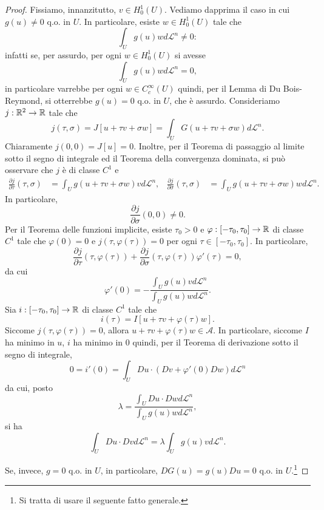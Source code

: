 \begin{proof}
Fissiamo, innanzitutto, $v \in H^1_0(U)$. Vediamo dapprima il caso in cui $g(u)\ne 0$ q.o. in $U$. In particolare, esiste $w \in H^1_0(U)$ tale che 
\[ \int_U g(u)wd\mathcal{L}^n \ne 0: \]
infatti se, per assurdo, per ogni $w \in H^1_0(U)$ si avesse 
\[ \int_U g(u)wd\mathcal{L}^n = 0, \]
in particolare varrebbe per ogni $w \in C^\infty_c(U)$ quindi, per il Lemma di Du Bois-Reymond, si otterrebbe $g(u)= 0$ q.o. in $U$, che è assurdo. Consideriamo $j: \mathbb{R}^2 \to \mathbb{R}$ tale che
\[ j(\tau,\sigma) = J[u+\tau v + \sigma w] = \int_U G(u+\tau v + \sigma w)d\mathcal{L}^n. \]
Chiaramente $j(0,0) = J[u] = 0$. Inoltre, per il Teorema di passaggio al limite sotto il segno di integrale ed il Teorema della convergenza dominata, si può osservare che $j$ è di classe $C^1$ e 
\begin{align*}
\frac{\partial j}{\partial \tau}(\tau,\sigma) &= \int_U g(u+\tau v + \sigma w)v d\mathcal{L}^n, & \frac{\partial j}{\partial \sigma}(\tau,\sigma) &= \int_U g(u+\tau v + \sigma w)w d\mathcal{L}^n.
\end{align*}
In particolare, 
\[ \frac{\partial j}{\partial \sigma}(0,0) \ne 0. \]
Per il Teorema delle funzioni implicite, esiste $\tau_0>0$ e $\varphi: [-\tau_0,\tau_0]\to \mathbb{R}$ di classe $C^1$ tale che $\varphi(0) = 0$ e $j(\tau,\varphi(\tau)) = 0$ per ogni $\tau \in [-\tau_0,\tau_0]$. In particolare,
\[ \frac{\partial j}{\partial \tau}(\tau,\varphi(\tau)) + \frac{\partial j}{\partial \sigma}(\tau,\varphi(\tau))\varphi'(\tau) = 0, \]
da cui 
\[ \varphi'(0) = - \frac{\int_U g(u)v d\mathcal{L}^n}{\int_U g(u)w d\mathcal{L}^n}. \]
Sia $i: [-\tau_0, \tau_0]\to \mathbb{R}$ di classe $C^1$ tale che
\[ i(\tau) = I[u+\tau v + \varphi(\tau) w]. \]
Siccome $j(\tau,\varphi(\tau)) = 0$, allora $u+\tau v + \varphi(\tau) w \in \mathcal{A}$. In particolare, siccome $I$ ha minimo in $u$, $i$ ha minimo in $0$ quindi, per il Teorema di derivazione sotto il segno di integrale,
	\[ 0 = i'(0) = \int_U Du \cdot (Dv + \varphi'(0)Dw)d\mathcal{L}^n\]
 da cui, posto 
 \[ \lambda = \frac{\int_U Du \cdot Dw d\mathcal{L}^n}{\int_U g(u)w d \mathcal{L}^n}, \]
 si ha 
 \[ \int_U Du\cdot Dv d\mathcal{L}^n = \lambda \int_U g(u)v d\mathcal{L}^n. \]
 
 Se, invece, $g=0$ q.o. in $U$, in particolare, $DG(u) = g(u)Du = 0$ q.o. in $U$.\footnote{Si tratta di usare il seguente fatto generale.
 	
}
\end{proof}
